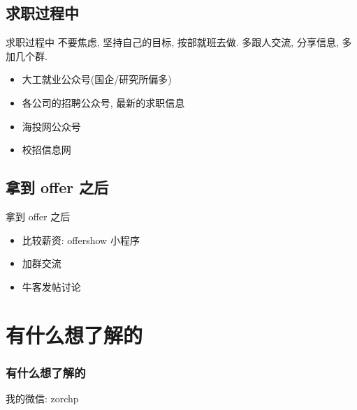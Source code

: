 \documentclass{ctexbeamer}
\begin{document}
\subsection{求职过程中}
\begin{frame}{求职过程中}
	不要焦虑, 坚持自己的目标, 按部就班去做. 
	多跟人交流, 分享信息, 多加几个群.
	\begin{itemize}
		\item 大工就业公众号(国企/研究所偏多)
		\item 各公司的招聘公众号, 最新的求职信息
		\item 海投网公众号
		\item 校招信息网
	\end{itemize}
\end{frame}

\subsection{拿到 offer 之后}
\begin{frame}{拿到 offer 之后}
	\begin{itemize}
		\item 比较薪资: offershow 小程序
		\item 加群交流
		\item 牛客发帖讨论
	\end{itemize}
\end{frame}

\section{有什么想了解的}

\begin{frame}
	\frametitle{有什么想了解的}

	我的微信: zorchp
\end{frame}

\begin{frame}{}
	\begin{center}
	\end{center}
\end{frame}
\end{document}

